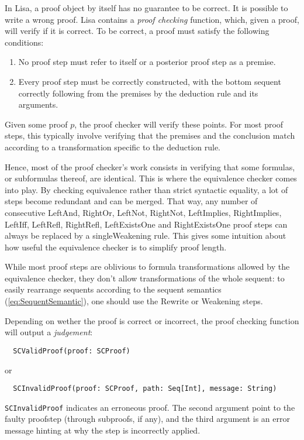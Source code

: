 In Lisa, a proof object by itself has no guarantee to be correct. It is possible to write a wrong proof. Lisa contains a \textit{proof checking} function, which, given a proof, will verify if it is correct. To be correct, a proof must satisfy the following conditions:
\begin{enumerate}
  \item No proof step must refer to itself or a posterior proof step as a premise.
  \item Every proof step must be correctly constructed, with the bottom sequent correctly following from the premises by the deduction rule and its arguments.
\end{enumerate}


Given some proof $p$, the proof checker will verify these points. For most proof steps, this typically involve verifying that the premises and the conclusion match according to a transformation specific to the deduction rule.

Hence, most of the proof checker's work consists in verifying that some formulas, or subformulas thereof, are identical. This is where the equivalence checker comes into play. By checking equivalence rather than strict syntactic equality, a lot of steps become redundant and can be merged. That way,  any number of consecutive {LeftAnd}, {RightOr}, {LeftNot}, {RightNot}, {LeftImplies}, {RightImplies}, {LeftIff}, {LeftRefl}, {RightRefl}, {LeftExistsOne} and  {RightExistsOne} proof steps can always be replaced by a single{Weakening} rule. This gives some intuition about how useful the equivalence checker is to simplify proof length.

While most proof steps are oblivious to formula transformations allowed by the equivalence checker, they don't allow transformations of the whole sequent: to easily rearrange sequents according to the sequent semantics (\autoref{eq:SequentSemantic}), one should use the Rewrite or Weakening steps.

Depending on wether the proof is correct or incorrect, the proof checking function will output a \textit{judgement}:
\begin{lstlisting}
  SCValidProof(proof: SCProof)
\end{lstlisting}
or
\begin{lstlisting}
  SCInvalidProof(proof: SCProof, path: Seq[Int], message: String)
\end{lstlisting}

\lstinline|SCInvalidProof|{} indicates an erroneous proof. The second argument point to the faulty proofstep (through subproofs, if any), and the third argument is an error message hinting at why the step is incorrectly applied.

